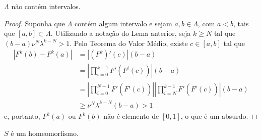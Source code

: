 \begin{lemma}
$\Lambda$ não contém intervalos.
\end{lemma}

\begin{proof}
Suponha que $\Lambda$ contém algum intervalo e sejam $a, b \in \Lambda$, com $a < b$, tais que $[a, b] \subset \Lambda$. Utilizando a notação do Lema anterior, seja $k \geq N$ tal que $(b - a) \nu^N \lambda^{k - N} > 1$. Pelo Teorema do Valor Médio, existe $c \in [a, b]$ tal que
\begin{align*}
|F^k(b) - F^k(a)| & = |(F^k)'(c)|(b-a) \\
& = \left| \prod_{i=0}^{k-1} F'(F^i(c)) \right| (b-a) \\ 
& = \left| \prod_{i=0}^{N-1} F'(F^i(c)) \right| \left| \prod_{i=N}^{k-1} F'(F^i(c)) \right| (b-a) \\
& \geq \nu^N \lambda^{k-N} (b-a) > 1
\end{align*}
e, portanto, $F^k(a)$ ou $F^k(b)$ não é elemento de $[0,1]$, o que é um absurdo.
\end{proof}

\begin{proposition}
$S$ é um homeomorfismo.
\end{proposition}


